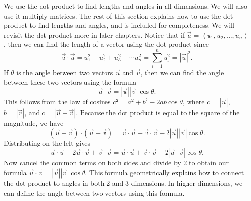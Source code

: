 We use the dot product to find lengths and angles in all dimensions. We will also use it multiply matrices.  The rest of this section explains how to use the dot product to find lengths and angles, and is included for completeness.  We will revisit the dot product more in later chapters.
Notice that if $\vec u = \left<u_1,u_2,\ldots,u_n\right>$, then we can find the length of a vector using the dot product since
$$\vec u\cdot \vec u = u_1^2+u_2^2+u_3^2+\cdots u_n^2 = \sum_{i=1}^n u_i^2 = |\vec u|^2.$$
If $\theta$ is the angle between two vectors $\vec u$ and $\vec v$, then we can find the angle between these two vectors using the formula 
$$\vec u \cdot \vec v = |\vec u||\vec v|\cos \theta.$$
This follows from the law of cosines $c^2 = a^2 + b^2 -2ab \cos \theta$, where $a=|\vec u|$, $b=|\vec v|$, and $c = |\vec u-\vec v|$. 
Because the dot product is equal to the square of the magnitude, we have 
$$(\vec u-\vec v)\cdot (\vec u-\vec v) = \vec u\cdot \vec u +\vec v\cdot \vec v -2|\vec u||\vec v|\cos \theta.$$
Distributing on the left gives 
$$\vec u\cdot \vec u - 2 \vec u \cdot \vec v +\vec v\cdot \vec v = \vec u\cdot \vec u +\vec v\cdot \vec v -2|\vec u||\vec v|\cos \theta.$$
Now cancel the common terms on both sides and divide by 2 to obtain our formula $\vec u \cdot \vec v = |\vec u||\vec v|\cos \theta$.  
This formula geometrically explains how to connect the dot product to angles in both 2 and 3 dimensions.  
In higher dimensions, we can define the angle between two vectors using this formula.

